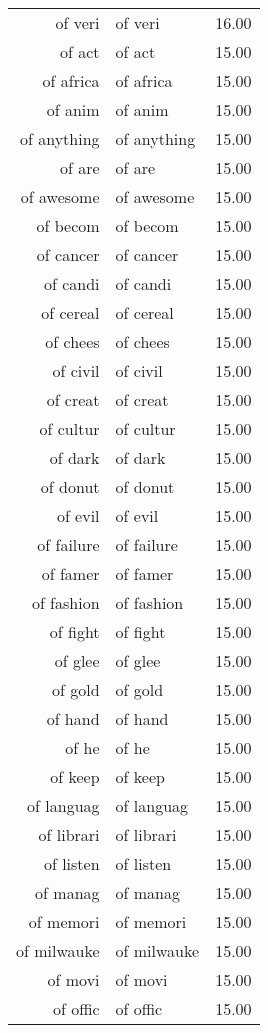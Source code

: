 \begin{table}[ht]
\begin{tabular}{rlr}
  of veri & of veri & 16.00 \\ 
  of act & of act & 15.00 \\ 
  of africa & of africa & 15.00 \\ 
  of anim & of anim & 15.00 \\ 
  of anything & of anything & 15.00 \\ 
  of are & of are & 15.00 \\ 
  of awesome & of awesome & 15.00 \\ 
  of becom & of becom & 15.00 \\ 
  of cancer & of cancer & 15.00 \\ 
  of candi & of candi & 15.00 \\ 
  of cereal & of cereal & 15.00 \\ 
  of chees & of chees & 15.00 \\ 
  of civil & of civil & 15.00 \\ 
  of creat & of creat & 15.00 \\ 
  of cultur & of cultur & 15.00 \\ 
  of dark & of dark & 15.00 \\ 
  of donut & of donut & 15.00 \\ 
  of evil & of evil & 15.00 \\ 
  of failure & of failure & 15.00 \\ 
  of famer & of famer & 15.00 \\ 
  of fashion & of fashion & 15.00 \\ 
  of fight & of fight & 15.00 \\ 
  of glee & of glee & 15.00 \\ 
  of gold & of gold & 15.00 \\ 
  of hand & of hand & 15.00 \\ 
  of he & of he & 15.00 \\ 
  of keep & of keep & 15.00 \\ 
  of languag & of languag & 15.00 \\ 
  of librari & of librari & 15.00 \\ 
  of listen & of listen & 15.00 \\ 
  of manag & of manag & 15.00 \\ 
  of memori & of memori & 15.00 \\ 
  of milwauke & of milwauke & 15.00 \\ 
  of movi & of movi & 15.00 \\ 
  of offic & of offic & 15.00 \\ 

\end{tabular}
\end{table}
